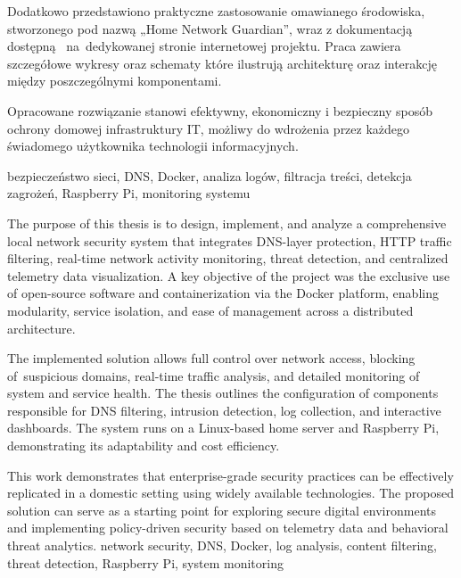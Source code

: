 \documentclass[
    left=2.5cm,         %
    right=2.5cm,        %
    top=2.5cm,          %
    bottom=3cm,         %
    bindingoffset=6mm,  %
    nohyphenation=true %
]{eiti/eiti-thesis} %
\begin{document}
Dodatkowo przedstawiono praktyczne zastosowanie omawianego środowiska, stworzonego pod nazwą „Home Network Guardian”\cite{github-homenetguardian}, wraz z dokumentacją dostępną ~na~dedykowanej stronie internetowej projektu. Praca zawiera szczegółowe wykresy oraz schematy które ilustrują architekturę oraz interakcję między poszczególnymi komponentami.

Opracowane rozwiązanie stanowi efektywny, ekonomiczny i bezpieczny sposób ochrony domowej infrastruktury IT, możliwy do wdrożenia przez każdego świadomego użytkownika technologii informacyjnych.

\slowakluczowe bezpieczeństwo sieci, DNS, Docker, analiza logów, filtracja treści, detekcja zagrożeń, Raspberry Pi, monitoring systemu

\newpage

\abstract The purpose of this thesis is to design, implement, and analyze a comprehensive local network security system that integrates DNS-layer protection, HTTP traffic filtering, real-time network activity monitoring, threat detection, and centralized telemetry data visualization. A key objective of the project was the exclusive use of open-source software and containerization via the Docker platform, enabling modularity, service isolation, and ease of management across a distributed architecture.

The implemented solution allows full control over network access, blocking of~suspicious domains, real-time traffic analysis, and detailed monitoring of system and service health. The thesis outlines the configuration of components responsible for DNS filtering, intrusion detection, log collection, and interactive dashboards. The system runs on a Linux-based home server and Raspberry Pi, demonstrating its adaptability and cost efficiency.

This work demonstrates that enterprise-grade security practices can be effectively replicated in a domestic setting using widely available technologies. The proposed solution can serve as a starting point for exploring secure digital environments and implementing policy-driven security based on telemetry data and behavioral threat analytics.
\keywords network security, DNS, Docker, log analysis, content filtering, threat detection, Raspberry Pi, system monitoring
\newpage

\end{document}

